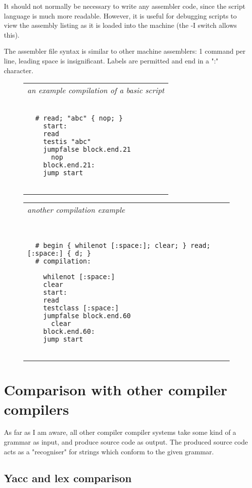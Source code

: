 \documentclass[a4paper,12pt]{article}
\begin{document}
  It should not normally be necessary to write any assembler code,
  since the script language is much more readable. However, it
  is useful for debugging scripts to view the assembly listing as
  it is loaded into the machine (the -I switch allows this).

  The assembler file syntax is similar to other machine assemblers:
  1 command per line, leading space is insignificant. Labels are
  permitted and end in a ":" character.
 \begin{figure}
 \begin{tabular}{ l }
 \emph{ an example compilation of a basic script  } \\ 
 \begin{lstlisting}[breaklines] 
 
  # read; "abc" { nop; }
    start:
    read
    testis "abc"
    jumpfalse block.end.21
      nop
    block.end.21:
    jump start 
  
 \end{lstlisting} 
 \end{tabular} 

 \end{figure}
 \begin{figure}
 \begin{tabular}{ l }
 \emph{ another compilation example } \\ 
 \begin{lstlisting}[breaklines] 

   
  # begin { whilenot [:space:]; clear; } read; [:space:] { d; }
  # compilation:

    whilenot [:space:]
    clear
    start:
    read
    testclass [:space:]
    jumpfalse block.end.60
      clear
    block.end.60:
    jump start 
  
 \end{lstlisting} 
 \end{tabular} 

 \end{figure}

\section{Comparison with other compiler compilers}

  As far as I am aware, all other compiler compiler systems take
  some kind of a grammar as input, and produce source code as
  output. The produced source code acts as a "recogniser" for
  strings which conform to the given grammar.

\subsection{Yacc and lex comparison}
\end{document}
